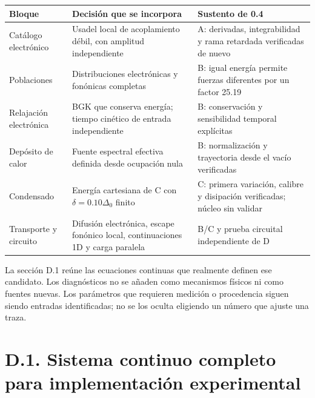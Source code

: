 \documentclass[
  spanish,
  10pt,
  a4paper,
]{article}
\newcounter{none} %
\begin{document}
{\def\LTcaptype{none} %
\begin{longtable}[]{@{}
  >{\raggedright\arraybackslash}p{}
  >{\raggedright\arraybackslash}p{}
  >{\raggedright\arraybackslash}p{}@{}}
\toprule\noalign{}
\begin{minipage}[b]{\linewidth}\raggedright
Bloque
\end{minipage} & \begin{minipage}[b]{\linewidth}\raggedright
Decisión que se incorpora
\end{minipage} & \begin{minipage}[b]{\linewidth}\raggedright
Sustento de 0.4
\end{minipage} \\
\midrule\noalign{}
\endhead
\bottomrule\noalign{}
\endlastfoot
Catálogo electrónico & Usadel local de acoplamiento débil, con amplitud
independiente & A: derivadas, integrabilidad y rama retardada
verificadas de nuevo \\
Poblaciones & Distribuciones electrónicas y fonónicas completas & B:
igual energía permite fuerzas diferentes por un factor 25.19 \\
Relajación electrónica & BGK que conserva energía; tiempo cinético de
entrada independiente & B: conservación y sensibilidad temporal
explícitas \\
Depósito de calor & Fuente espectral efectiva definida desde ocupación
nula & B: normalización y trayectoria desde el vacío verificadas \\
Condensado & Energía cartesiana de C con \(\delta=0.10\Delta_0\) finito
& C: primera variación, calibre y disipación verificadas; núcleo sin
validar \\
Transporte y circuito & Difusión electrónica, escape fonónico local,
continuaciones 1D y carga paralela & B/C y prueba circuital
independiente de D \\
\end{longtable}
}

La sección D.1 reúne las ecuaciones continuas que realmente definen ese
candidato. Los diagnósticos no se añaden como mecanismos físicos ni como
fuentes nuevas. Los parámetros que requieren medición o procedencia
siguen siendo entradas identificadas; no se los oculta eligiendo un
número que ajuste una traza.

\section{D.1. Sistema continuo completo para implementación
experimental}\label{d.1.-sistema-continuo-completo-para-implementaciuxf3n-experimental}
\end{document}
